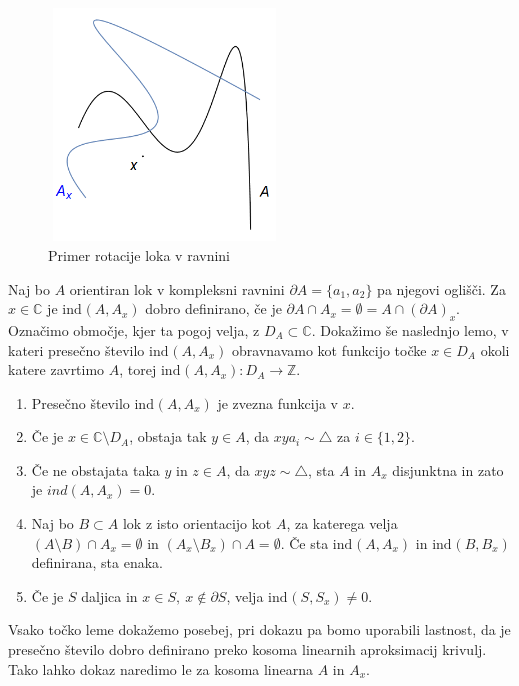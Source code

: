 \documentclass[mat1]{fmfdelo}
\newcommand{\Z}{\mathbb Z}
\newcommand{\C}{\mathbb C}
\newcommand{\ind}[3][]{\text{ind}_{#1}(#2, #3)}
\begin{document}
\begin{figure}[h!]
\centering
\includegraphics[width = 175pt, height = 175pt]{rotacija_zacetna.png}
\caption{Primer rotacije loka v ravnini}
\label{fig:rotacija_osnovna}
\end{figure}

Naj bo $A$ orientiran lok v kompleksni ravnini $\partial A = \{a_1, a_2\}$ pa njegovi oglišči. Za $x\in \C$ je $\ind{A}{A_x}$ dobro definirano, če je $\partial A \cap A_x = \emptyset = A \cap (\partial A)_x$. Označimo območje, kjer ta pogoj velja, z $D_A \subset \C$. Dokažimo še naslednjo lemo, v kateri presečno število $\ind{A}{A_x}$ obravnavamo kot funkcijo točke $x \in D_A$ okoli katere zavrtimo $A$, torej $\ind{A}{A_x} \colon D_A \to \Z$.

\begin{lema}\label{le:lema2}
\begin{enumerate}
\item Presečno število $\ind{A}{A_x}$ je zvezna funkcija v $x$.
\item Če je $x \in \C \setminus D_A$, obstaja tak $y \in A$, da $xya_i \sim \triangle$ za $i \in \{1, 2\}$.
\item Če ne obstajata taka $y$ in $z \in A$, da $xyz \sim \triangle$, sta $A$ in $A_x$ disjunktna in zato je $ind(A, A_x) = 0$.
\item Naj bo $B \subset A$ lok z isto orientacijo kot $A$, za katerega velja $(A \setminus B) \cap A_x = \emptyset$ in $(A_x \setminus B_x) \cap A = \emptyset$. Če sta $\ind{A}{A_x}$ in $\ind{B}{B_x}$ definirana, sta enaka.
\item Če je $S$ daljica in $x \in S,\ x \notin \partial S$, velja $\ind{S}{S_x} \neq 0$.
\end{enumerate}
\end{lema}

\proof
Vsako točko leme dokažemo posebej, pri dokazu pa bomo uporabili lastnost, da je presečno število dobro definirano preko kosoma linearnih aproksimacij krivulj. Tako lahko dokaz naredimo le za kosoma linearna $A$ in $A_x$.
\end{document}
